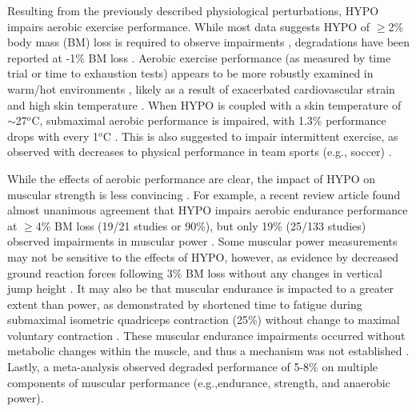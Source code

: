 Resulting from the previously described physiological perturbations, HYPO impairs aerobic exercise performance. While most data suggests HYPO of ${\geq}$2\% body mass (BM) loss is required to observe impairments \cite{sawka_hypohydration_2015}, degradations have been reported at -1\% BM loss \cite{bardis_mild_2013}. Aerobic exercise performance (as measured by time trial or time to exhaustion tests) appears to be more robustly examined in warm/hot environments \cite{sawka_human_1992,cheuvront_mechanisms_2010,ebert_influence_2007}, likely as a result of exacerbated cardiovascular strain \cite{costill_plasma_1974,cheuvront_mechanisms_2010} and high skin temperature \cite{sawka_high_2012}. When HYPO is coupled with a skin temperature of ${\sim}$27${^o}$C, submaximal aerobic performance is impaired, with 1.3\% performance drops with every 1${^o}$C \cite{sawka_high_2012}. This is also suggested to impair intermittent exercise, as observed with decreases to physical performance in team sports (e.g., soccer) \cite{nuccio_fluid_2017}.     

While the effects of aerobic performance are clear, the impact of HYPO on muscular strength is less convincing \cite{cheuvront_dehydration:_2014}. For example, a recent review article found almost unanimous agreement that HYPO impairs aerobic endurance performance at ${\geq}$4\% BM loss (19/21 studies or 90\%), but only 19\% (25/133 studies) observed impairments in muscular power \cite{cheuvront_dehydration:_2014}. Some muscular power measurements may not be sensitive to the effects of HYPO, however, as evidence by decreased ground reaction forces following 3\% BM loss without any changes in vertical jump height \cite{cheuvront_hypohydration_2010}. It may also be that muscular endurance is impacted to a greater extent than power, as demonstrated by shortened time to fatigue during submaximal isometric quadriceps contraction (25\%) without change to maximal voluntary contraction \cite{bigard_effects_2001}. These muscular endurance impairments occurred without metabolic changes within the muscle, and thus a mechanism was not established \cite{bigard_effects_2001}. Lastly, a meta-analysis \cite{savoie_effect_2015} observed degraded performance of 5-8\% on multiple components of muscular performance (e.g.,endurance, strength, and anaerobic power).


